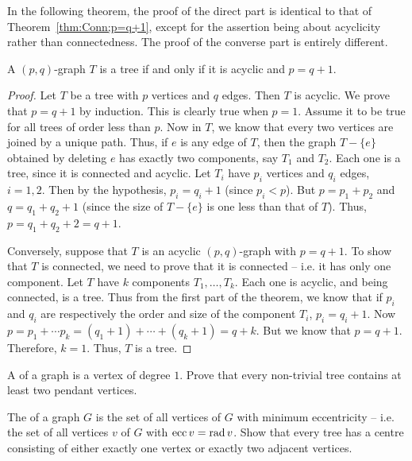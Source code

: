 In the following theorem, the proof of the direct part is identical to that of Theorem~\ref{thm:Conn;p=q+1}, except for the assertion being about acyclicity rather than connectedness. The proof of the converse part is entirely different.
\begin{Theorem}\label{thm:Acyc;p=q+1}
A $(p,q)$-graph $T$ is a tree if and only if it is acyclic and $p = q + 1$.
\end{Theorem}
\begin{proof}
Let $T$ be a tree with $p$ vertices and $q$ edges. Then $T$ is acyclic. We prove that $p = q + 1$ by induction. This is clearly true when $p = 1$. Assume it to be true for all trees of order less than $p$. Now in $T$, we know that every two vertices are joined by a unique path. Thus, if $e$ is any edge of $T$, then the graph $T - \{e\}$ obtained by deleting $e$ has exactly two components, say $T_1$ and $T_2$. Each one is a tree, since it is connected and acyclic. Let $T_i$ have $p_i$ vertices and $q_i$ edges, $i = 1, 2$. Then by the hypothesis, $p_i = q_i + 1$ (since $p_i < p$). But $p = p_1 + p_2$ and $q = q_1 + q_2 + 1$ (since the size of $T - \{e\}$ is one less than that of $T$). Thus, $p = q_1 + q_2 + 2 = q + 1$.

Conversely, suppose that $T$ is an acyclic $(p,q)$-graph with $p = q + 1$. To show that $T$ is connected, we need to prove that it is connected -- i.e. it has only one component. Let $T$ have $k$ components $T_1, \ldots, T_k$. Each one is acyclic, and being connected, is a tree. Thus from the first part of the theorem, we know that if $p_i$ and $q_i$ are respectively the order and size of the component $T_i$, $p_i = q_i + 1$. Now $p = p_1 + \cdots p_k = (q_1 + 1) + \cdots + (q_k + 1) = q + k$. But we know that $p = q + 1$. Therefore, $k = 1$. Thus, $T$ is a tree.
\end{proof}

\begin{Exercise}
A  of a graph is a vertex of degree $1$. Prove that every non-trivial tree contains at least two pendant vertices.\\
\end{Exercise}

\begin{Exercise}\label{exer:TreeCentre}
The  of a graph $G$ is the set of all vertices of $G$ with minimum eccentricity -- i.e. the set of all vertices $v$ of $G$ with $\operatorname{ecc} v = \operatorname{rad} v$. Show that every tree has a centre consisting of either exactly one vertex or exactly two adjacent vertices.\\
\end{Exercise}

